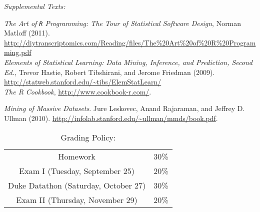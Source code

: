 \documentclass[11pt]{article}
\begin{document}
\emph{Supplemental Texts:} 


\emph{The Art of \texttt{R} Programming: The Tour of Statistical Software Design}, Norman Matloff (2011). \url{http://diytranscriptomics.com/Reading/files/The%20Art%20of%20R%20Programming.pdf}\\

\emph{Elements of Statistical Learning: Data Mining, Inference, and Prediction, Second Ed.}, Trevor Hastie, Robert Tibshirani, and Jerome Friedman (2009). \url{http://statweb.stanford.edu/~tibs/ElemStatLearn/}\\

\emph{The R Cookbook}, \url{http://www.cookbook-r.com/}.


\emph{Mining of Massive Datasets}. Jure Leskovec, Anand Rajaraman, and Jeffrey D. Ullman (2010). \url{http://infolab.stanford.edu/~ullman/mmds/book.pdf}.



\begin{table}[ht]
\caption{Grading Policy:}
\begin{center}
\begin{tabular}{cc}
Homework & 30\%\\
Exam I (Tuesday, September 25) &20\%\\
Duke Datathon (Saturday, October 27) & 30\%\\
Exam  II (Thursday, November 29) & 20\%\\

\end{tabular}
\end{center}
\label{default}
\end{table}%
\end{document}
